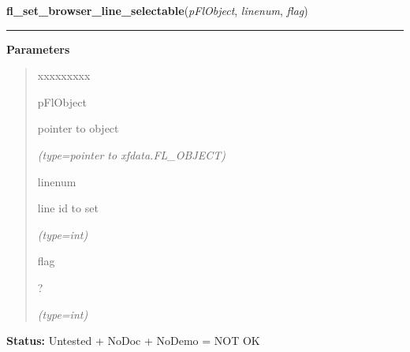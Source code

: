 \hspace{.8\funcindent}\begin{boxedminipage}{\funcwidth}

    \raggedright \textbf{fl\_set\_browser\_line\_selectable}(\textit{pFlObject}, \textit{linenum}, \textit{flag})

    \vspace{-1.5ex}

    \rule{\textwidth}{0.5\fboxrule}
\setlength{\parskip}{2ex}
\setlength{\parskip}{1ex}
      \textbf{Parameters}
      \vspace{-1ex}

      \begin{quote}
        \begin{Ventry}{xxxxxxxxx}

          \item[pFlObject]

          pointer to object

            {\it (type=pointer to xfdata.FL\_OBJECT)}

          \item[linenum]

          line id to set

            {\it (type=int)}

          \item[flag]

          ?

            {\it (type=int)}

        \end{Ventry}

      \end{quote}

\textbf{Status:} Untested + NoDoc + NoDemo = NOT OK



    \end{boxedminipage}

    \label{xformslib:flbrowser:fl_get_browser_dimension}

    \vspace{0.5ex}


